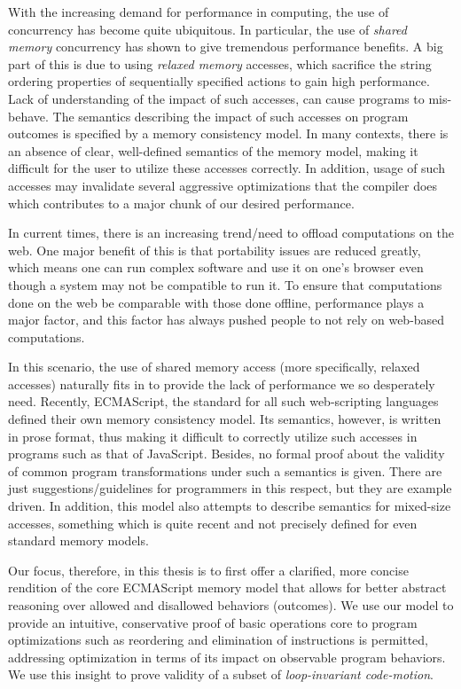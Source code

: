      
With the increasing demand for performance in computing, the use of concurrency has become quite ubiquitous. 
In particular, the use of \textit{shared memory} concurrency has shown to give tremendous performance benefits. 
A big part of this is due to using \textit{relaxed memory} accesses, which sacrifice the string ordering properties of sequentially specified actions to gain high performance. 
Lack of understanding of the impact of such accesses, can cause programs to mis-behave.
The semantics describing the impact of such accesses on program outcomes is specified by a memory consistency model. 
In many contexts, there is an absence of clear, well-defined semantics of the memory model, making it difficult for the user to utilize these accesses correctly.
In addition, usage of such accesses may invalidate several aggressive optimizations that the compiler does which contributes to a major chunk of our desired performance.

In current times, there is an increasing trend/need to offload computations on the web. 
One major benefit of this is that portability issues are reduced greatly, which means one can run complex software and use it on one's browser even though a system may not be compatible to run it. 
To ensure that computations done on the web be comparable with those done offline, performance plays a major factor, and this factor has always pushed people to not rely on web-based computations. 

In this scenario, the use of shared memory access (more specifically, relaxed accesses) naturally fits in to provide the lack of performance we so desperately need.
Recently, ECMAScript, the standard for all such web-scripting languages defined their own memory consistency model\cite{ECMA}.
Its semantics, however, is written in prose format, thus making it difficult to correctly utilize such accesses in programs such as that of JavaScript. 
Besides, no formal proof about the validity of common program transformations under such a semantics is given.
There are just suggestions/guidelines for programmers in this respect, but they are example driven.
In addition, this model also attempts to describe semantics for mixed-size accesses, something which is quite recent and not precisely defined for even standard memory models. 

Our focus, therefore, in this thesis is to first offer a clarified, more concise rendition of the core ECMAScript memory model that allows for better abstract reasoning over allowed and disallowed behaviors (outcomes). 
We use our model to provide an intuitive, conservative proof of basic operations core to program optimizations such as reordering and elimination of instructions is permitted, addressing optimization in terms of its impact on observable program behaviors. 
We use this insight to prove validity of a subset of \textit{loop-invariant code-motion}\cite{Muchnick}. 

